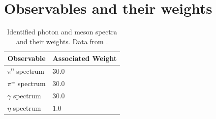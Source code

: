 \documentclass[aps,preprint,floatfix,nofootinbib,showpacs]{revtex4-1}
\begin{document}
\section{Observables and their weights}
 \begin{table}[!h]
  \begin{center}
   \begin{tabular}{l|l}
    \hline 
    \hline
    Observable  \hspace{3cm} &  \hspace{1cm} Associated Weight \\ \hline
    $\pi^0$ spectrum         & \hspace{3cm} $30.0$ \\ \hline
    $\pi^\pm$ spectrum       & \hspace{3cm} $30.0$ \\ \hline
    $\gamma$ spectrum        & \hspace{3cm} $30.0$ \\ \hline
    $\eta$ spectrum          & \hspace{3cm} $1.0$ \\ \hline \hline
   \end{tabular}
  \end{center}
  \caption{Identified photon and meson spectra and their weights. Data from
  \cite{Buskulic:1994ft, Barate:1996fi, Heister:2001kp, Adriani:1992hd, Akers:1994ez, Ackerstaff:1998ap, Abe:1998zs}.}
  \label{Tab1}
 \end{table}
 
\end{document}
